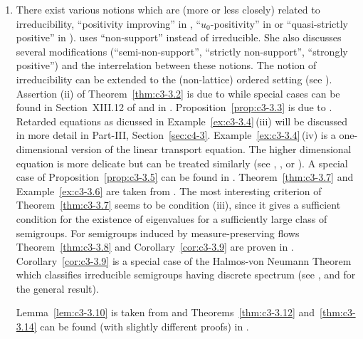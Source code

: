 \begin{enumerate}[label=\emph{Section \arabic*:}, wide, itemsep=1ex]
\item
There exist various notions which are (more or less closely) related to irreducibility, \eg \enquote{positivity improving} in \textcite{reedsimon:1979}, \enquote{$u_0$-positivity} in 
\textcite{krasnoselskii:1964} or \enquote{quasi-strictly positive} in \textcite{karlin:1959}). \textcite{sawashima:1964} uses \enquote{non-support} instead of irreducible. 
She also discusses several modifications (\enquote{semi-non-support}, \enquote{strictly non-support}, \enquote{strongly positive}) and the interrelation between these notions. 
The notion of irreducibility can be extended to the (non-lattice) ordered setting (see \textcite{battyrobinson:1984}). 
Assertion \upshape(ii) of Theorem~\ref{thm:c3-3.2} is due to \textcite{majewskirobinson:1983} while special cases can be found in Section~XIII.12 of \textcite{reedsimon:1979} and in \textcite{kishimotorobinson:1981}. 
Proposition~\ref{prop:c3-3.3} is due to \textcite{voigt:1984a}. 
Retarded equations as dicussed in Example~\ref{ex:c3-3.4}\,(iii) will be discussed in more detail in 
Part-III, Section~\ref{sec:c4-3}.
Example~\ref{ex:c3-3.4}\,(iv) is a one-dimensional version of the linear transport equation. 
The higher dimensional equation is more delicate but can be treated similarly (see \eg \textcite{greiner:1984b}, \textcite{kaperetal:1983a}, or \textcite{voigt:1984b}). 
A special case of Proposition~\ref{prop:c3-3.5} can be found in \textcite{davies:1980}. 
Theorem~\ref{thm:c3-3.7} and Example~\ref{ex:c3-3.6} are taken from \textcite{schaefer:1985}. 
The most interesting criterion of Theorem~\ref{thm:c3-3.7} seems to be condition (iii), since it gives a sufficient condition for the existence of eigenvalues for a sufficiently large class of semigroups. 
For semigroups induced by measure-preserving flows Theorem~\ref{thm:c3-3.8} and Corollary~\ref{cor:c3-3.9} are proven in \textcite{cornfeldetal:1982}. 
Corollary~\ref{cor:c3-3.9} is a special case of the Halmos-von Neumann Theorem which classifies irreducible semigroups having discrete spectrum (see \textcite{cornfeldetal:1982}, \textcite{greiner:1982} and \textcite{schaefer:1974} for the general result). 

Lemma~\ref{lem:c3-3.10} is taken from \textcite{groh:1984b} and Theorems~\ref{thm:c3-3.12} and~\ref{thm:c3-3.14} can be found (with slightly different proofs) in \textcite{greiner:1981}. 


\end{enumerate}
